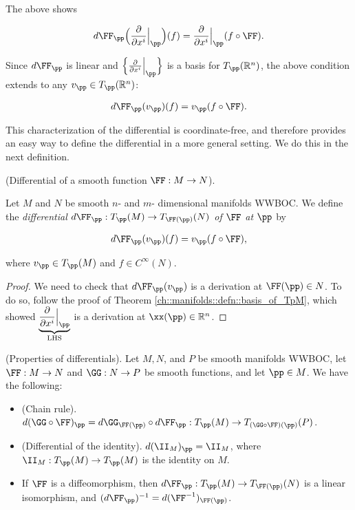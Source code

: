 \begin{defn}
    The above shows
    
    \begin{align*}
        d\FF_\pp \Big( \frac{\pd}{\pd x^i}\Big|_\pp \Big)(f) = \frac{\pd}{\pd x^i}\Big|_\pp (f \circ \FF).
    \end{align*}
    
    Since $d\FF_\pp$ is linear and $\Big\{ \frac{\pd}{\pd x^i}\Big|_\pp \Big\}$ is a basis for $T_\pp(\R^n)$, the above condition extends to any $v_\pp \in T_\pp(\R^n)$:
    
    \begin{align*}
        d\FF_\pp (v_\pp )(f) = v_\pp (f \circ \FF).
    \end{align*}
\end{defn}

This characterization of the differential is coordinate-free, and therefore provides an easy way to define the differential in a more general setting. We do this in the next definition. 

\begin{defn}
\label{ch::manifolds::defn::differential_smooth_function_abstract}
    (Differential of a smooth function $\FF:M \rightarrow N$).
    
    Let $M$ and $N$ be smooth $n$- and $m$- dimensional manifolds WWBOC. We define the \textit{differential $d\FF_\pp:T_\pp(M) \rightarrow T_{\FF(\pp)}(N)$ of $\FF$ at $\pp$} by
    
    \begin{align*}
        d\FF_\pp(v_\pp)(f) = v_\pp(f \circ \FF),
    \end{align*}
    
    where $v_\pp \in T_\pp(M)$ and $f \in C^\infty(N)$.
\end{defn}

\begin{proof}
    We need to check that $d\FF_\pp(v_\pp)$ is a derivation at $\FF(\pp) \in N$. To do so, follow the proof of Theorem \ref{ch::manifolds::defn::basis_of_TpM}, which showed $\underbrace{\frac{\pd}{\pd x^i}\Big|_\pp}_{\text{LHS}}$ is a derivation at $\xx(\pp) \in \R^n$.
\end{proof}

\begin{theorem}
     (Properties of differentials). Let $M, N$, and $P$ be smooth manifolds WWBOC, let $\FF:M \rightarrow N$ and $\GG:N \rightarrow P$ be smooth functions, and let $\pp \in M$. We have the following:
    
    \begin{itemize}
        \item (Chain rule). $d(\GG \circ \FF)_\pp = d\GG_{\FF(\pp)} \circ d\FF_\pp:T_\pp(M) \rightarrow T_{(\GG \circ \FF)(\pp)}(P)$.
        \item (Differential of the identity). $d(\II_M)_\pp = \II_M$, where $\II_M:T_\pp(M) \rightarrow T_\pp(M)$ is the identity on $M$.
        \item If $\FF$ is a diffeomorphism, then $d\FF_\pp:T_\pp(M) \rightarrow T_{\FF(\pp)}(N)$ is a linear isomorphism, and $(d\FF_\pp)^{-1} = d(\FF^{-1})_{\FF(\pp)}$.
    \end{itemize}
\end{theorem}

